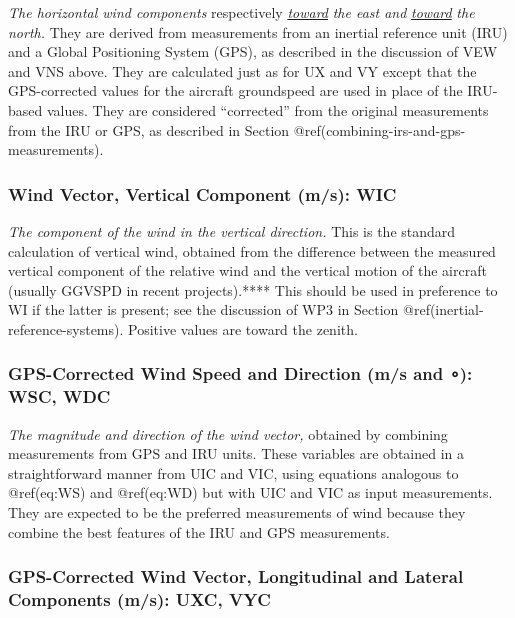 \documentclass[
  english,
]{book}
\begin{document}
\emph{The horizontal wind components} respectively
\emph{\underline{toward}} \emph{the east and} \emph{\underline{toward}}
\emph{the north.} They are derived from measurements from an inertial
reference unit (IRU) and a Global Positioning System (GPS), as described
in the discussion of VEW and VNS above. They are calculated just as for
UX and VY except that the GPS-corrected values for the aircraft
groundspeed are used in place of the IRU-based values. They are
considered ``corrected'' from the original measurements from the IRU or
GPS, as described in Section @ref(combining-irs-and-gps-measurements).

\hypertarget{wic}{%
\subsubsection*{Wind Vector, Vertical Component (m/s): WIC}\label{wic}}

\emph{The component of the wind in the vertical direction.} This is the
standard calculation of vertical wind, obtained from the difference
between the measured vertical component of the relative wind and the
vertical motion of the aircraft (usually GGVSPD in recent projects).****
This should be used in preference to WI if the latter is present; see
the discussion of WP3 in Section @ref(inertial-reference-systems).
Positive values are toward the zenith.

\hypertarget{wsc-wdc}{%
\subsubsection*{\texorpdfstring{GPS-Corrected Wind Speed and Direction
(m/s and {∘}): WSC,
WDC}{GPS-Corrected Wind Speed and Direction (m/s and ∘): WSC, WDC}}\label{wsc-wdc}}

\emph{The magnitude and direction of the wind vector,} obtained by
combining measurements from GPS and IRU units. These variables are
obtained in a straightforward manner from UIC and VIC, using equations
analogous to @ref(eq:WS) and @ref(eq:WD) but with UIC and VIC as input
measurements. They are expected to be the preferred measurements of wind
because they combine the best features of the IRU and GPS measurements.

\hypertarget{uxc-vyc}{%
\subsubsection*{GPS-Corrected Wind Vector, Longitudinal and Lateral
Components (m/s): UXC, VYC}\label{uxc-vyc}}
\end{document}
